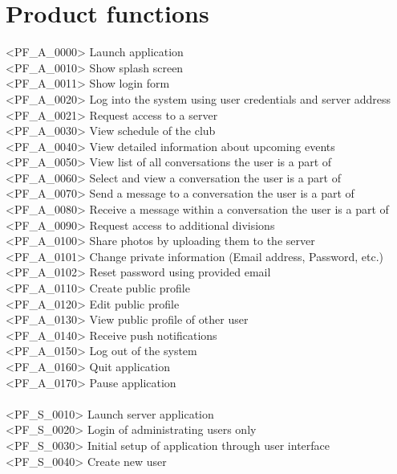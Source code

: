 \chapter{Product functions}
<PF\_A\_0000> Launch application \\
<PF\_A\_0010> Show splash screen \\
<PF\_A\_0011> Show login form \\ 
<PF\_A\_0020> Log into the system using user credentials and server address \\
<PF\_A\_0021> Request access to a server \\
<PF\_A\_0030> View schedule of the club \\
<PF\_A\_0040> View detailed information about upcoming events \\
<PF\_A\_0050> View list of all conversations the user is a part of \\
<PF\_A\_0060> Select and view a conversation the user is a part of \\
<PF\_A\_0070> Send a message to a conversation the user is a part of \\
<PF\_A\_0080> Receive a message within a conversation the user is a part of \\
<PF\_A\_0090> Request access to additional divisions \\
<PF\_A\_0100> Share photos by uploading them to the server \\
<PF\_A\_0101> Change private information (Email address, Password, etc.) \\
<PF\_A\_0102> Reset password using provided email \\
<PF\_A\_0110> Create public profile \\
<PF\_A\_0120> Edit public profile \\
<PF\_A\_0130> View public profile of other user \\
<PF\_A\_0140> Receive push notifications \\
<PF\_A\_0150> Log out of the system \\
<PF\_A\_0160> Quit application \\
<PF\_A\_0170> Pause application \\
\\
<PF\_S\_0010> Launch server application \\
<PF\_S\_0020> Login of administrating users only \\
<PF\_S\_0030> Initial setup of application through user interface \\
<PF\_S\_0040> Create new user \\
